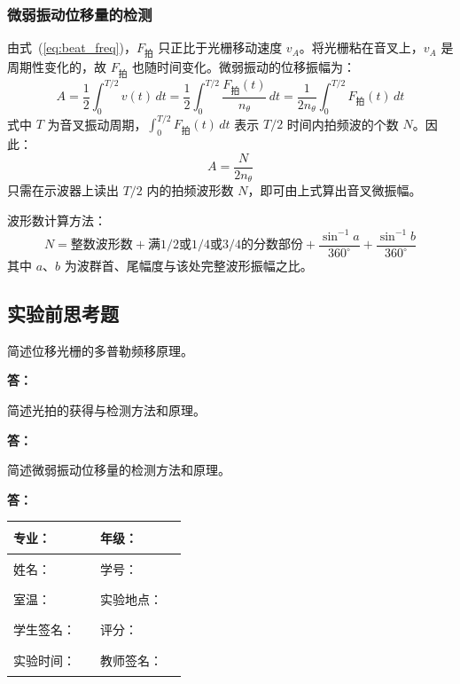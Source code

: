 \documentclass[dvipsnames, svgnames,a4paper,11pt]{article}
\newcommand{\answerblank}[1][3.8cm]{%
  \par\nopagebreak[4]\noindent\textbf{答：}\par\nopagebreak[4]\vspace*{#1}}
\begin{document}
\subsubsection{微弱振动位移量的检测}

由式~(\ref{eq:beat_freq})，$F_\text{拍}$ 只正比于光栅移动速度 $v_A$。将光栅粘在音叉上，$v_A$ 是周期性变化的，故 $F_\text{拍}$ 也随时间变化。微弱振动的位移振幅为：
\begin{equation}
    A = \frac{1}{2}\int_0^{T/2}v(t)\,dt = \frac{1}{2}\int_0^{T/2}\frac{F_\text{拍}(t)}{n_\theta}\,dt = \frac{1}{2n_\theta}\int_0^{T/2}F_\text{拍}(t)\,dt
    \label{eq:amplitude}
\end{equation}
式中 $T$ 为音叉振动周期，$\displaystyle\int_0^{T/2}F_\text{拍}(t)\,dt$ 表示 $T/2$ 时间内拍频波的个数 $N$。因此：
\begin{equation}
    \boxed{A = \frac{N}{2n_\theta}}
    \label{eq:amp_N}
\end{equation}
只需在示波器上读出 $T/2$ 内的拍频波形数 $N$，即可由上式算出音叉微振幅。

波形数计算方法：
\[
    N = \text{整数波形数} + \text{满}1/2\text{或}1/4\text{或}3/4\text{的分数部份} + \frac{\sin^{-1}a}{360^\circ} + \frac{\sin^{-1}b}{360^\circ}
\]
其中 $a$、$b$ 为波群首、尾幅度与该处完整波形振幅之比。
\clearpage
\subsection{实验前思考题}

\begin{question}
	简述位移光栅的多普勒频移原理。
\end{question}
\answerblank[3.8cm]
\begin{question}
	简述光拍的获得与检测方法和原理。
\end{question}
\answerblank[3.8cm]
\begin{question}
	简述微弱振动位移量的检测方法和原理。
\end{question}
\answerblank[3.8cm]
\clearpage
\begin{table}
	\renewcommand\arraystretch{1.7}
	\centering
	\begin{tabularx}{\textwidth}{|X|X|X|X|}
	\hline
	专业：& \rule{2.5cm}{0.4pt} &年级：& \rule{2.5cm}{0.4pt} \\
	\hline
	姓名： & \rule{2.5cm}{0.4pt} & 学号：& \rule{3cm}{0.4pt} \\
	\hline
	室温：& \rule{2.5cm}{0.4pt} & 实验地点： & \rule{2.5cm}{0.4pt} \\
	\hline
	学生签名：&\rule{2.5cm}{0.4pt} & 评分： &\\
	\hline
	实验时间：& \rule{3cm}{0.4pt} & 教师签名：& \rule{3cm}{0.4pt} \\
	\hline
	\end{tabularx}
\end{table}
\end{document}
